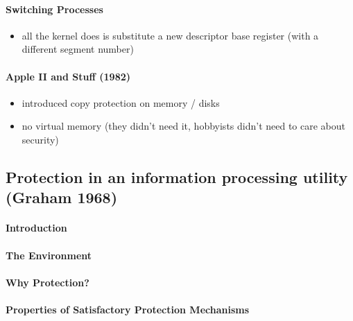 \documentclass[
  12pt]{findlay}
\providecommand{\tightlist}{%
  \setlength{\itemsep}{0pt}\setlength{\parskip}{0pt}}
\begin{document}
\hypertarget{switching-processes}{%
\paragraph{Switching Processes}\label{switching-processes}}

\begin{itemize}
\tightlist
\item
  all the kernel does is substitute a new descriptor base register (with
  a different segment number)
\end{itemize}

\hypertarget{apple-ii-and-stuff-1982}{%
\paragraph{Apple II and Stuff (1982)}\label{apple-ii-and-stuff-1982}}

\begin{itemize}
\tightlist
\item
  introduced copy protection on memory / disks
\item
  no virtual memory (they didn't need it, hobbyists didn't need to care
  about security)
\end{itemize}

\hypertarget{protection-in-an-information-processing-utility-graham-1968}{%
\subsection{Protection in an information processing utility (Graham
1968)}\label{protection-in-an-information-processing-utility-graham-1968}}

\hypertarget{introduction-1}{%
\paragraph{Introduction}\label{introduction-1}}

\hypertarget{the-environment}{%
\paragraph{The Environment}\label{the-environment}}

\hypertarget{why-protection}{%
\paragraph{Why Protection?}\label{why-protection}}

\hypertarget{properties-of-satisfactory-protection-mechanisms}{%
\paragraph{Properties of Satisfactory Protection
Mechanisms}\label{properties-of-satisfactory-protection-mechanisms}}
\end{document}
